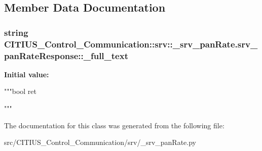 \subsection{\-Member \-Data \-Documentation}
\hypertarget{class_c_i_t_i_u_s___control___communication_1_1srv_1_1__srv__pan_rate_1_1srv__pan_rate_response_a6ce8a9e421c0d6ec6c02853e08439041}{
\subsubsection[{\-\_\-full\-\_\-text}]{\setlength{\rightskip}{0pt plus 5cm}string \-C\-I\-T\-I\-U\-S\-\_\-\-Control\-\_\-\-Communication\-::srv\-::\-\_\-srv\-\_\-pan\-Rate.\-srv\-\_\-pan\-Rate\-Response\-::\-\_\-full\-\_\-text}}\label{class_c_i_t_i_u_s___control___communication_1_1srv_1_1__srv__pan_rate_1_1srv__pan_rate_response_a6ce8a9e421c0d6ec6c02853e08439041}
{\bfseries \-Initial value\-:}
\begin{DoxyCode}
"""bool ret


"""
\end{DoxyCode}


\-The documentation for this class was generated from the following file\-:\begin{DoxyCompactItemize}
\item 
src/\-C\-I\-T\-I\-U\-S\-\_\-\-Control\-\_\-\-Communication/srv/\-\_\-srv\-\_\-pan\-Rate.\-py\end{DoxyCompactItemize}
